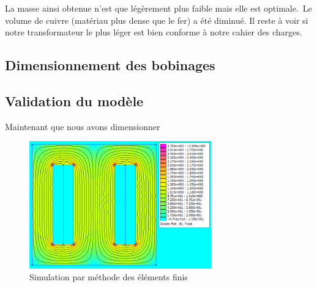 La masse ainsi obtenue n'est que légèrement plus faible mais elle est optimale.  Le volume de cuivre (matériau plus dense que le fer) a été diminué. Il reste à voir si notre transformateur le plus léger est bien conforme à notre cahier des charges.\\

\subsection{Dimensionnement des bobinages}

\subsection{Validation du modèle}
Maintenant que nous avons dimensionner

\begin{figure}
	\begin{center}
	\includegraphics[width=0.7\textwidth]{images/TP1_FEMM_validation}
	\caption{Simulation par méthode des éléments finis}\label{img:FEMMvalidation}
	\end{center}
\end{figure}
\FloatBarrier 
